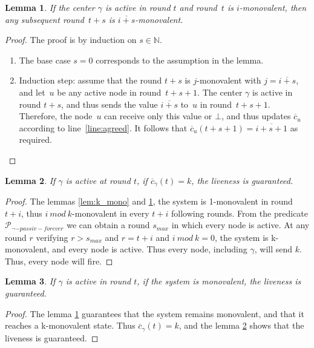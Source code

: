 \documentclass{article}
\newtheorem{lemma}{Lemma}[section]
\newcommand{\cent}{\gamma}
\newcommand{\IN}{\mathds{N}}
\begin{document}
\begin{lemma}\label{lem:mono_mono}
If the center $\cent$ is active in round $t$  and round~$t$ is $i$-monovalent, 
	then any subsequent round~$ t + s$ is $\overline{i+ s}$-monovalent.
\end{lemma}

\begin{proof}
The proof is by induction on $s \in \IN$.
\begin{enumerate}
		\item The base case $s=0$ corresponds to the assumption in the lemma.
		\item Induction step:  assume that the round $t+s$ is $j$-monovalent with $j = \overline{i+s} $,
			 and let~$u$ be  any active node in round~$t+s+1$.
			The center $\cent$ is active in round $t +s$, and thus sends the value $\overline{i+s}$ to~$u$
				in round~$ t+s+1$.
			Therefore, the node~$u$ can receive only this value or $\bot$, and thus updates
				$\overline{c}_u$ according to line~\ref{line:agreed}. 
			It follows that $ \overline{c}_u(t+s+1) = \overline{i+s +1}$ as required.
\end{enumerate}
\end{proof}

\begin{lemma}\label{lem:k_liv}
	If $\cent$ is active at round $t$, if $\overline{c}_\cent(t) = k$, the liveness is guaranteed.
\end{lemma}
\begin{proof}
	The lemmas \ref{lem:k_mono} and \ref{lem:mono_mono}, the system is 1-monovalent in round $t+i$,
	thus $i~mod~k$-monovalent in every $t+i$ following rounds.
	From the predicate $\mathcal{P}_{\neg-passiv-forever}$ we can obtain a round $s_{max}$ in which every node is active.
	At any round $r$ verifying $r > s_{max}$ and $r = t + i$ and $i~mod~k = 0$, the system is k-monovalent,
	and every node is active. Thus every node, including $\cent$, will send $k$.
	Thus, every node will fire.
\end{proof}
 
\begin{lemma}\label{lem:mono_liv}
	If $\cent$ is active in round $t$, if the system is monovalent, the liveness is guaranteed.
\end{lemma}
\begin{proof}
	The lemma \ref{lem:mono_mono} guarantees that the system remains monovalent, and that it reaches a
	k-monovalent state.
	Thus $\overline{c}_\cent(t) = k$, and the lemma \ref{lem:k_liv} shows that the liveness is guaranteed.
\end{proof}
\end{document}
